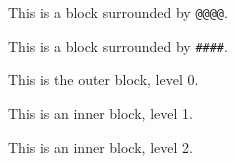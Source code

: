 This is a block surrounded by \texttt{@@@@}.



This is a block surrounded by \texttt{\#\#\#\#}.



This is the outer block, level 0.

This is an inner block, level 1.

This is an inner block, level 2.




